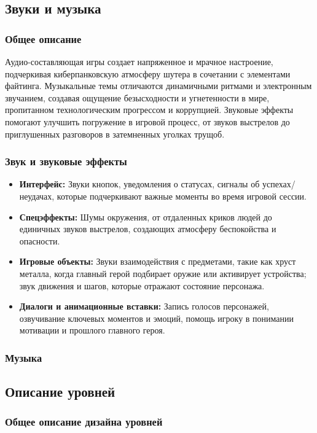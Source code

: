 \documentclass{article}
\begin{document}
\begin{itemize}
\subsection{Звуки и музыка}
\subsubsection{Общее описание}
Аудио-составляющая игры создает напряженное и мрачное настроение, подчеркивая киберпанковскую атмосферу шутера в сочетании с элементами файтинга. Музыкальные темы отличаются динамичными ритмами и электронным звучанием, создавая ощущение безысходности и угнетенности в мире, пропитанном технологическим прогрессом и коррупцией. Звуковые эффекты помогают улучшить погружение в игровой процесс, от звуков выстрелов до приглушенных разговоров в затемненных уголках трущоб.

\subsubsection{Звук и звуковые эффекты}
\begin{itemize}
    \item \textbf{Интерфейс:} Звуки кнопок, уведомления о статусах, сигналы об успехах/неудачах, которые подчеркивают важные моменты во время игровой сессии.
    \item \textbf{Спецэффекты:} Шумы окружения, от отдаленных криков людей до единичных звуков выстрелов, создающих атмосферу беспокойства и опасности.
    \item \textbf{Игровые объекты:} Звуки взаимодействия с предметами, такие как хруст металла, когда главный герой подбирает оружие или активирует устройства; звук движения и шагов, которые отражают состояние персонажа.
    \item \textbf{Диалоги и анимационные вставки:} Запись голосов персонажей, озвучивание ключевых моментов и эмоций, помощь игроку в понимании мотивации и прошлого главного героя.
\end{itemize}

\subsubsection{Музыка}

\subsection{Описание уровней}

\subsubsection{Общее описание дизайна уровней}


\end{itemize}
\end{document}
